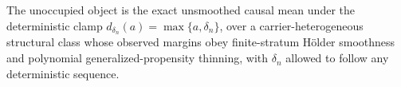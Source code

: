 The unoccupied object is the exact unsmoothed causal mean under the deterministic clamp \(d_{\delta_n}(a)=\max\{a,\delta_n\}\), over a carrier-heterogeneous structural class whose observed margins obey finite-stratum Hölder smoothness and polynomial generalized-propensity thinning, with \(\delta_n\) allowed to follow any deterministic sequence.